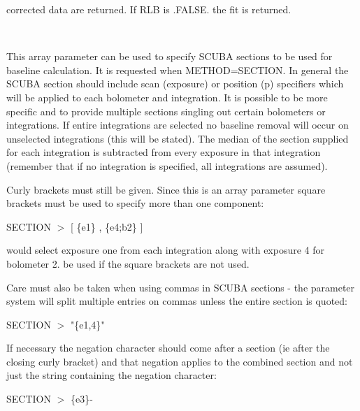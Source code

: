 \documentclass[twoside,11pt]{article}
\renewcommand{\_}{\texttt{\symbol{95}}}
\newcommand{\sstsubsection}[1]{ \item[{#1}] \mbox{} \\}
\newcommand{\sstsubsection}[1]{\item[{#1}]}
\begin{document}
{{{         corrected data are returned. If RLB is .FALSE. the fit is returned.
      }
      \sstsubsection{
         SECTION = CHAR (Read)
      }{
   This array parameter can be used to specify SCUBA sections
   to be used for baseline calculation. It is requested when 
   METHOD=SECTION. In general the SCUBA section should
   include scan (exposure) or position (p) specifiers which 
   will be applied to each bolometer and integration. It is
   possible to be more specific and to provide multiple sections
   singling out certain bolometers or integrations. If entire
   integrations are selected no baseline removal will occur
   on unselected integrations (this will be stated).
   The median of the section supplied for each integration
   is subtracted from every exposure in that integration (remember
   that if no integration is specified, all integrations are assumed).

   Curly brackets must still be given. Since this is an array
   parameter square brackets must be used to specify more than
   one component:

       SECTION $>$ [ \{e1\} , \{e4;b2\} ]

   would select exposure one from each integration along with
   exposure 4 for bolometer 2.
   be used if the square brackets are not used. 

   Care must also be taken when using commas in SCUBA sections -
   the parameter system will split multiple entries on commas 
   unless the entire section is quoted:

       SECTION $>$ "\{e1,4\}"

   If necessary the negation character should come after a
   section (ie after the closing curly bracket) and that 
   negation applies to the combined section and not just the string 
   containing the negation character:

       SECTION $>$ \{e3\}-

}}}
\end{document}

